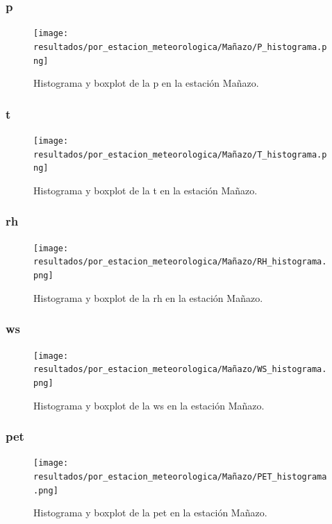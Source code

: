 \subsubsection*{\gls{p} }
\begin{figure}[htbp]
\centering
\texttt{[image: resultados/por\_estacion\_meteorologica/Mañazo/P\_histograma.png]}
\caption{Histograma y boxplot de la \gls{p}  en la estación Mañazo.}
\label{fig:manazo_P}
\end{figure}

\subsubsection*{\gls{t} }
\begin{figure}[htbp]
\centering
\texttt{[image: resultados/por\_estacion\_meteorologica/Mañazo/T\_histograma.png]}
\caption{Histograma y boxplot de la \gls{t}  en la estación Mañazo.}
\label{fig:manazo_T}
\end{figure}

\subsubsection*{\gls{rh} }
\begin{figure}[htbp]
\centering
\texttt{[image: resultados/por\_estacion\_meteorologica/Mañazo/RH\_histograma.png]}
\caption{Histograma y boxplot de la \gls{rh}  en la estación Mañazo.}
\label{fig:manazo_RH}
\end{figure}

\subsubsection*{\gls{ws} }
\begin{figure}[htbp]
\centering
\texttt{[image: resultados/por\_estacion\_meteorologica/Mañazo/WS\_histograma.png]}
\caption{Histograma y boxplot de la \gls{ws}  en la estación Mañazo.}
\label{fig:manazo_WS}
\end{figure}

\subsubsection*{\gls{pet} }
\begin{figure}[htbp]
\centering
\texttt{[image: resultados/por\_estacion\_meteorologica/Mañazo/PET\_histograma.png]}
\caption{Histograma y boxplot de la \gls{pet}  en la estación Mañazo.}
\label{fig:manazo_PET}
\end{figure}


